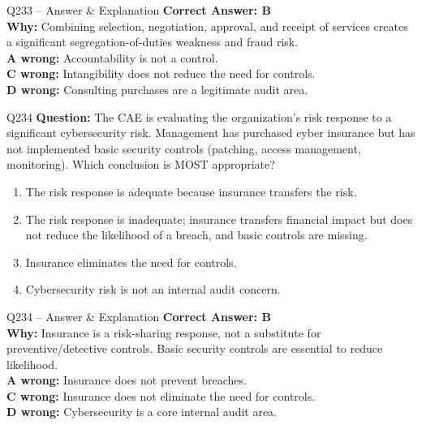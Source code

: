 \documentclass[aspectratio=169,10pt]{beamer}
\begin{document}
	\begin{frame}[t]{Q233 -- Answer \& Explanation}
		\small
		\textbf{Correct Answer: B} \\[4pt]
		\textbf{Why:} Combining selection, negotiation, approval, and receipt of services creates a significant segregation-of-duties weakness and fraud risk. \\[4pt]
		\textbf{A wrong:} Accountability is not a control. \\[2pt]
		\textbf{C wrong:} Intangibility does not reduce the need for controls. \\[2pt]
		\textbf{D wrong:} Consulting purchases are a legitimate audit area.
	\end{frame}
	
	\begin{frame}[t]{Q234}
		\small
		\textbf{Question:} The CAE is evaluating the organization's risk response to a significant cybersecurity risk. Management has purchased cyber insurance but has not implemented basic security controls (patching, access management, monitoring). Which conclusion is MOST appropriate?
		\begin{enumerate}[label=\Alph*.,itemsep=1pt,topsep=2pt]
			\item The risk response is adequate because insurance transfers the risk.
			\item The risk response is inadequate; insurance transfers financial impact but does not reduce the likelihood of a breach, and basic controls are missing.
			\item Insurance eliminates the need for controls.
			\item Cybersecurity risk is not an internal audit concern.
		\end{enumerate}
	\end{frame}
	
	\begin{frame}[t]{Q234 -- Answer \& Explanation}
		\small
		\textbf{Correct Answer: B} \\[4pt]
		\textbf{Why:} Insurance is a risk-sharing response, not a substitute for preventive/detective controls. Basic security controls are essential to reduce likelihood. \\[4pt]
		\textbf{A wrong:} Insurance does not prevent breaches. \\[2pt]
		\textbf{C wrong:} Insurance does not eliminate the need for controls. \\[2pt]
		\textbf{D wrong:} Cybersecurity is a core internal audit area.
	\end{frame}
	
\end{document}
